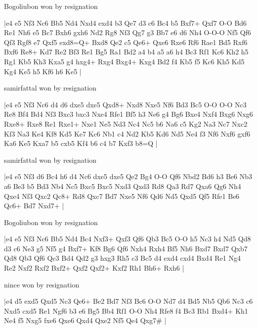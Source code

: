 \showboard

Bogoliubon won by resignation

\makegametitle
|e4 e5 Nf3 Nc6 Bb5 Nd4 Nxd4 exd4 b3 Qe7 d3 c6 Bc4 b5 Bxf7+ Qxf7 O-O Bd6 Re1 Nh6 e5 Bc7 Bxh6 gxh6 Nd2 Rg8 Nf3 Qg7 g3 Bb7 e6 d6 Nh4 O-O-O Nf5 Qf6 Qf3 Rgf8 e7 Qxf5 exd8=Q+ Bxd8 Qe2 c5 Qe6+ Qxe6 Rxe6 Rf6 Rae1 Bd5 Rxf6 Bxf6 Re8+ Kd7 Re2 Bf3 Re1 Bg5 Ra1 Bd2 a4 b4 a5 a6 h4 Bc3 Rf1 Kc6 Kh2 h5 Rg1 Kb5 Kh3 Kxa5 g4 hxg4+ Rxg4 Bxg4+ Kxg4 Bd2 f4 Kb5 f5 Kc6 Kh5 Kd5 Kg4 Ke5 h5 Kf6 h6 Ke5  |

\showboard

samirfattal won by resignation

\makegametitle
|e4 e5 Nf3 Nc6 d4 d6 dxe5 dxe5 Qxd8+ Nxd8 Nxe5 Nf6 Bd3 Bc5 O-O O-O Nc3 Re8 Bf4 Bd4 Nf3 Bxc3 bxc3 Nxe4 Rfe1 Bf5 h3 Ne6 g4 Bg6 Bxe4 Nxf4 Bxg6 Nxg6 Rxe8+ Rxe8 Re1 Rxe1+ Nxe1 Ne5 Nd3 Nc4 Nc5 b6 Na6 c5 Kg2 Na3 Nc7 Nxc2 Kf3 Na3 Ke4 Kf8 Kd5 Ke7 Kc6 Nb1 c4 Nd2 Kb5 Kd6 Nd5 Ne4 f3 Nf6 Nxf6 gxf6 Ka6 Ke5 Kxa7 b5 cxb5 Kf4 b6 c4 b7 Kxf3 b8=Q  |

\showboard

samirfattal won by resignation

\makegametitle
|e4 e5 Nf3 d6 Bc4 h6 d4 Nc6 dxe5 dxe5 Qe2 Bg4 O-O Qf6 Nbd2 Bd6 h3 Be6 Nb3 a6 Be3 b5 Bd3 Nb4 Nc5 Bxc5 Bxc5 Nxd3 Qxd3 Rd8 Qa3 Rd7 Qxa6 Qg6 Nh4 Qxe4 Nf3 Qxc2 Qc8+ Rd8 Qxc7 Bd7 Nxe5 Nf6 Qd6 Nd5 Qxd5 Qf5 Rfe1 Be6 Qc6+ Bd7 Nxd7+  |

\showboard

Bogoliubon won by resignation

\makegametitle
|e4 e5 Nf3 Nc6 Bb5 Nd4 Bc4 Nxf3+ Qxf3 Qf6 Qb3 Bc5 O-O h5 Nc3 h4 Nd5 Qd8 d3 c6 Ne3 g5 Nf5 g4 Bxf7+ Kf8 Bg6 Qf6 Nxh4 Rxh4 Bf5 Nh6 Bxd7 Bxd7 Qxb7 Qd8 Qb3 Qf6 Qc3 Bd4 Qd2 g3 hxg3 Rh5 c3 Bc5 d4 exd4 cxd4 Bxd4 Re1 Ng4 Re2 Nxf2 Rxf2 Bxf2+ Qxf2 Qxf2+ Kxf2 Rh1 Bh6+ Rxh6  |

\showboard

nince won by resignation

\makegametitle
|e4 d5 exd5 Qxd5 Nc3 Qe6+ Be2 Bd7 Nf3 Bc6 O-O Nd7 d4 Bd5 Nb5 Qb6 Nc3 c6 Nxd5 cxd5 Re1 Ngf6 b3 e6 Bg5 Bb4 Rf1 O-O Nh4 Rfe8 f4 Bc3 Rb1 Bxd4+ Kh1 Ne4 f5 Nxg5 fxe6 Qxe6 Qxd4 Qxe2 Nf5 Qe4 Qxg7\#  |

